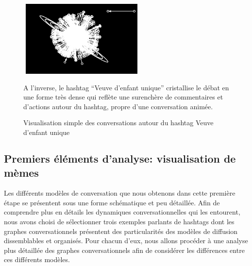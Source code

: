 \begin{figure}[ht]
    \begin{minipage}[b]{0.4\linewidth}
        \centering
        \includegraphics[width=2.5in,height=1.5in]{figures/chap3/chapitre3-img12.png}
        \par\vspace{0pt}
    \end{minipage}
    \begin{minipage}[b]{0.55\linewidth}
        \centering
        \raggedright
        A l{\textquoteright}inverse, le hashtag {\textquotedblleft}Veuve
        d{\textquoteright}enfant
        unique{\textquotedblright}  cristallise
        le débat en une forme très dense qui reflète une surenchère de
        commentaires et d{\textquoteright}actions autour du hashtag, propre
        d{\textquoteright}une conversation animée. 
        \par\vspace{0pt}
    \end{minipage}

    \caption[Visualisation simple des conversations autour du hashtag Veuve d{\textquoteright}enfant unique]{Visualisation simple des conversations autour du hashtag Veuve d{\textquoteright}enfant unique}
\end{figure}


\subsection[Premiers éléments d{\textquoteright}analyse: visualisation de mèmes ]{Premiers éléments d{\textquoteright}analyse: visualisation de mèmes }

Les différents modèles de conversation que nous obtenons dans cette première étape se présentent sous une forme schématique et peu détaillée. Afin de comprendre plus en détails les dynamiques conversationnelles qui les entourent, nous avons choisi de sélectionner trois exemples parlants de hashtags dont les graphes conversationnels présentent des particularités des modèles de diffusion dissemblables et organisés. Pour chacun d{\textquoteright}eux, nous allons procéder à une analyse plus détaillée des graphes conversationnels afin de considérer les différences entre ces différents modèles.


